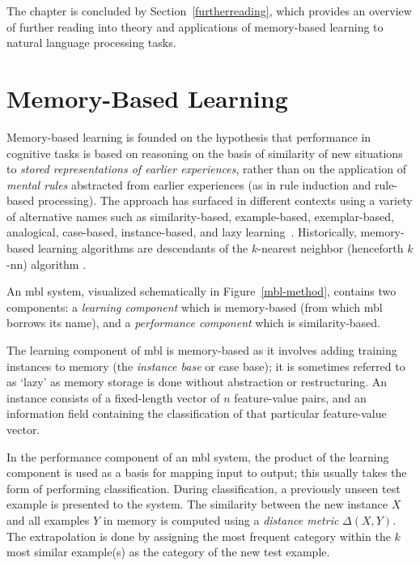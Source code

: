 \documentclass{report}
\begin{document}
The chapter is concluded by Section~\ref{furtherreading}, which
provides an overview of further reading into theory and applications
of memory-based learning to natural language processing tasks.

\section{Memory-Based Learning}
\label{mbl}

Memory-based learning is founded on the hypothesis that performance in
cognitive tasks is based on reasoning on the basis of similarity of
new situations to {\em stored representations of earlier experiences},
rather than on the application of {\em mental rules}\/ abstracted from
earlier experiences (as in rule induction and rule-based processing).
The approach has surfaced in different contexts using a variety of
alternative names such as similarity-based, example-based,
exemplar-based, analogical, case-based, in\-stance-based, and lazy
learning~\cite{Stanfill+86,Cost+93,Kolodner93,Aha+91,Aha97a}.
Historically, memory-based learning algorithms are descendants of the
$k$-nearest neighbor (henceforth $k$-{\sc nn}) algorithm
\cite{Cover+67,Devijver+82,Aha+91}.

An {\sc mbl} system, visualized schematically in
Figure~\ref{mbl-method}, contains two components: a {\em learning
component}\/ which is memory-based (from which {\sc mbl} borrows its
name), and a {\em performance component}\/ which is similarity-based.

The learning component of {\sc mbl} is memory-based as it involves
adding training instances to memory (the {\em instance base} or case
base); it is sometimes referred to as `lazy' as memory storage is done
without abstraction or restructuring.  An instance consists of a
fixed-length vector of $n$ feature-value pairs, and an information
field containing the classification of that particular feature-value
vector.  

In the performance component of an {\sc mbl} system, the product of
the learning component is used as a basis for mapping input to output;
this usually takes the form of performing classification.  During
classification, a previously unseen test example is presented to the
system. The similarity between the new instance $X$ and all examples
$Y$ in memory is computed using a {\em distance metric}
$\Delta(X,Y)$. The extrapolation is done by assigning the most
frequent category within the $k$ most similar example(s) as the
category of the new test example.
\end{document}

